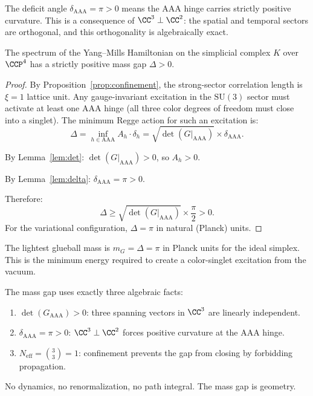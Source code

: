 \begin{remark}
The deficit angle $\delta_{\mathrm{AAA}} = \pi > 0$ means the AAA
hinge carries strictly positive curvature. This is a consequence of
$\CC^3 \perp \CC^2$: the spatial and temporal sectors
are orthogonal, and this orthogonality is algebraically exact.
\end{remark}

\begin{theorem}
\label{thm:massgap}
The spectrum of the Yang--Mills Hamiltonian on the simplicial complex $K$
over $\CCP^4$ has a strictly positive mass gap $\Delta > 0$.
\end{theorem}

\begin{proof}
By Proposition~\ref{prop:confinement}, the strong-sector correlation
length is $\xi = 1$ lattice unit. Any gauge-invariant excitation in
the $\mathrm{SU}(3)$ sector must activate at least one AAA hinge
(all three color degrees of freedom must close into a singlet).
The minimum Regge action for such an excitation is:
\begin{equation}
\Delta = \inf_{h \in \mathrm{AAA}} A_h \cdot \delta_h
= \sqrt{\det(G|_{\mathrm{AAA}})} \times \delta_{\mathrm{AAA}}.
\end{equation}

By Lemma~\ref{lem:det}: $\det(G|_{\mathrm{AAA}}) > 0$,
so $A_h > 0$.

By Lemma~\ref{lem:delta}: $\delta_{\mathrm{AAA}} = \pi > 0$.

Therefore:
\begin{equation}
\boxed{\Delta \geq \sqrt{\det(G|_{\mathrm{AAA}})} \times
\frac{\pi}{2} > 0.}
\end{equation}
For the variational configuration, $\Delta = \pi$ in natural
(Planck) units.
\end{proof}

\begin{corollary}
The lightest glueball mass is $m_G = \Delta = \pi$ in Planck units
for the ideal simplex. This is the minimum energy required to create
a color-singlet excitation from the vacuum.
\end{corollary}

\begin{remark}
The mass gap uses exactly three algebraic facts:
\begin{enumerate}
\item[(i)] $\det(G_{\mathrm{AAA}}) > 0$: three spanning vectors in
  $\CC^3$ are linearly independent.
\item[(ii)] $\delta_{\mathrm{AAA}} = \pi > 0$:
  $\CC^3 \perp \CC^2$ forces positive curvature at the
  AAA hinge.
\item[(iii)] $N_{\mathrm{eff}} = \binom{3}{3} = 1$: confinement
  prevents the gap from closing by forbidding propagation.
\end{enumerate}
No dynamics, no renormalization, no path integral. The mass gap is
geometry.
\end{remark}

